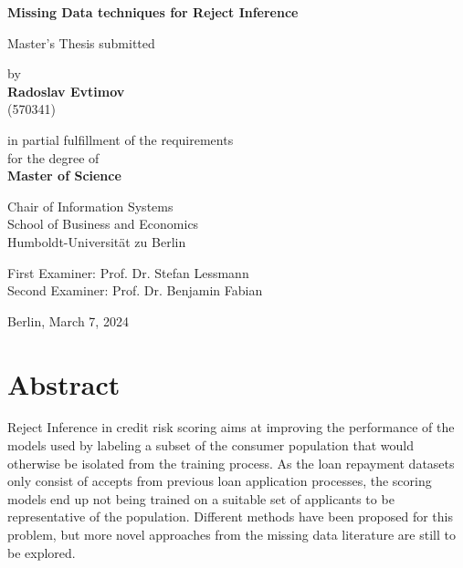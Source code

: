 \documentclass[11pt,a4paper]{article}
\begin{document}

\thispagestyle{empty}
\null
\vfill
\begin{center}


    {\Large{\bf Missing Data techniques for Reject Inference}} \vspace{0.5cm}


    {\normalsize Master's Thesis submitted\\\vspace{0.5cm}



    {\normalsize by \\\vspace{0.5cm}
    {\bf Radoslav Evtimov} \\
    (570341)} \vspace{1cm}
    }


    {\normalsize in partial fulfillment of the requirements \\
    for the degree of \\
    {\bf Master of Science}


    \vspace{5 cm}
    {\normalsize Chair of Information Systems \\
    School of Business and Economics \\
    Humboldt-Universit\"at zu Berlin 
    } \vspace{1cm}

    First Examiner: Prof. Dr. Stefan Lessmann \\
    Second Examiner: Prof. Dr. Benjamin Fabian

    \vspace{1cm}
    Berlin, March 7, 2024}
    \end{center}

    \newpage




\section*{Abstract}



Reject Inference in credit risk scoring aims at improving the performance of the models used by labeling a subset of the consumer population that would otherwise be isolated from the training process. As the loan repayment datasets only consist of accepts from previous loan application processes, the scoring models end up not being trained on a suitable set of applicants to be representative of the population. Different methods have been proposed for this problem, but more novel approaches from the missing data literature are still to be explored.
\end{document}
